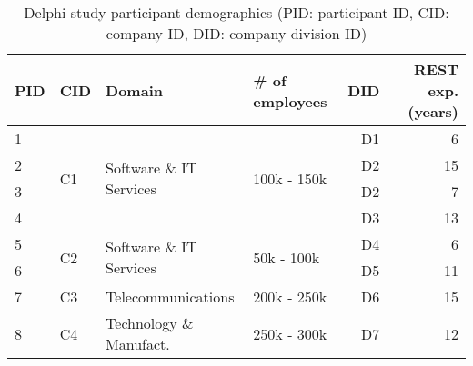 \documentclass[runningheads]{llncs}
\begin{document}
\begin{table}
    \centering
	\caption{Delphi study participant demographics (PID: participant ID, CID: company ID, DID: company division ID)}
	\label{table:participants}
	\begin{tabular}{llllrr}
		PID & CID & Domain & \# of employees & DID & REST exp. (years)\\
		\hline
		\hline
		1 & \multirow{4}{*}{C1} & \multirow{4}{*}{Software \& IT Services} & \multirow{4}{*}{100k - 150k} & D1 & 6\\
        2 & & & & D2 & 15\\
        3 & & & & D2 & 7\\
        4 & & & & D3 & 13\\
        \hline
        5 & \multirow{2}{*}{C2} & \multirow{2}{*}{Software \& IT Services} & \multirow{2}{*}{50k - 100k} & D4 & 6\\
        6 & & & & D5 & 11\\
        \hline
        7 & C3 & Telecommunications & 200k - 250k & D6 & 15\\
        \hline
        8 & C4 & Technology \& Manufact. & 250k - 300k & D7 & 12\\
		\hline
	\end{tabular}
\end{table}
\end{document}
